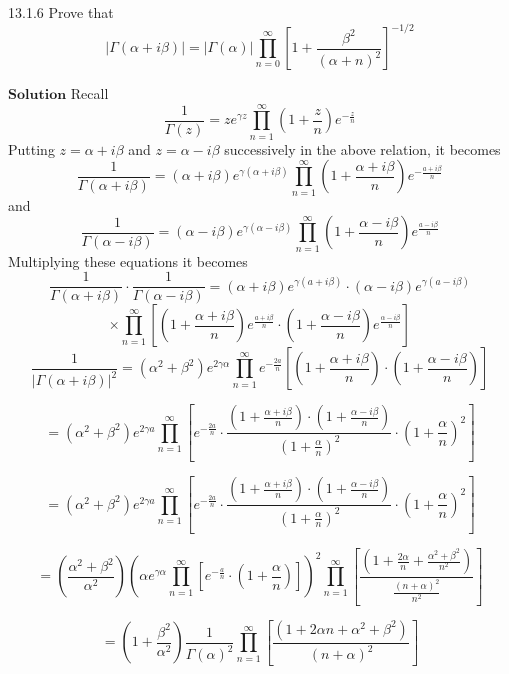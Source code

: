 \newpage

\begin{mybox}{13.1.6}
Prove that 
$$|\Gamma(\alpha+i \beta)|=|\Gamma(\alpha)| \prod_{n=0}^{\infty}\left[1+\frac{\beta^{2}}{(\alpha+n)^{2}}\right]^{-1 / 2}$$
\end{mybox}

$\boxed{\textbf{Solution}}$ Recall 
$$
\frac{1}{\Gamma(z)}=z e^{\gamma z} \prod_{n=1}^{\infty}\left(1+\frac{z}{n}\right) e^{-\frac{z}{n}}
$$
Putting $z=\alpha+i \beta$ and $z=\alpha-i \beta$ successively in the above relation, it becomes
$$
\frac{1}{\Gamma(\alpha+i \beta)}=(\alpha+i \beta) e^{\gamma(\alpha+i \beta)} \prod_{n=1}^{\infty}\left(1+\frac{\alpha+i \beta}{n}\right) e^{-\frac{a+i \beta}{n}}
$$
and 
$$
\frac{1}{\Gamma(\alpha-i \beta)}=(\alpha-i \beta) e^{\gamma(\alpha-i \beta)} \prod_{n=1}^{\infty}\left(1+\frac{\alpha-i \beta}{n}\right) e^{\frac{a-i \beta}{n}}
$$
Multiplying these equations it becomes
$$
\frac{1}{\Gamma(\alpha+i \beta)} \cdot \frac{1}{\Gamma(\alpha-i \beta)}=(\alpha+i \beta) e^{\gamma(a+i \beta)} \cdot(\alpha-i \beta) e^{\gamma(a-i \beta)}$$
$$\times \prod_{n=1}^{\infty}\left[\left(1+\frac{\alpha+i \beta}{n}\right) e^{\frac{a+i \beta}{n}} \cdot\left(1+\frac{\alpha-i \beta}{n}\right) e^{\frac{\alpha-i \beta}{n}}\right]
$$
$$
\frac{1}{|\Gamma(\alpha+i \beta)|^{2}}=\left(\alpha^{2}+\beta^{2}\right) e^{2\gamma \alpha} \prod_{n=1}^{\infty} e^{-\frac{2 a}{n}}\left[\left(1+\frac{\alpha+i \beta}{n}\right) \cdot\left(1+\frac{\alpha-i \beta}{n}\right)\right]
$$

$$
=\left(\alpha^{2}+\beta^{2}\right) e^{2 \gamma a} \prod_{n=1}^{\infty}\left[e^{-\frac{2 a}{n}} \cdot \frac{\left(1+\frac{\alpha+i \beta}{n}\right) \cdot\left(1+\frac{\alpha-i \beta}{n}\right)}{\left(1+\frac{\alpha}{n}\right)^{2}} \cdot\left(1+\frac{\alpha}{n}\right)^{2}\right]
$$

$$
=\left(\alpha^{2}+\beta^{2}\right) e^{2 \gamma a} \prod_{n=1}^{\infty}\left[e^{-\frac{2 a}{n}} \cdot \frac{\left(1+\frac{\alpha+i \beta}{n}\right) \cdot\left(1+\frac{\alpha-i \beta}{n}\right)}{\left(1+\frac{\alpha}{n}\right)^{2}} \cdot\left(1+\frac{\alpha}{n}\right)^{2}\right]
$$

$$
=\left(\frac{\alpha^{2}+\beta^{2}}{\alpha^{2}}\right)\left(\alpha e^{\gamma \alpha} \prod_{n=1}^{\infty}\left[e^{-\frac{a}{n}} \cdot\left(1+\frac{\alpha}{n}\right)\right]\right)^{2} \prod_{n=1}^{\infty}\left[\frac{\left(1+\frac{2 \alpha}{n}+\frac{\alpha^{2}+\beta^{2}}{n^{2}}\right)}{\frac{(n+\alpha)^{2}}{n^{2}}}\right]
$$


$$
=\left(1+\frac{\beta^{2}}{\alpha^{2}}\right) \frac{1}{\Gamma(\alpha)^{2}} \prod_{n=1}^{\infty}\left[\frac{\left(1+2 \alpha n+\alpha^{2}+\beta^{2}\right)}{(n+\alpha)^{2}}\right]
$$

